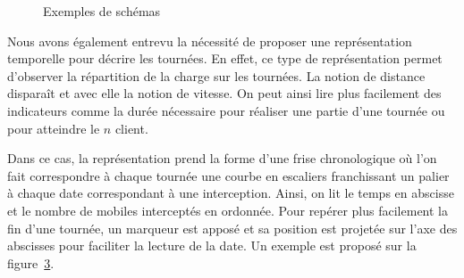 			\begin{figure}[h!]
				\begin{subfigure}[b]{.45\linewidth}
					\centering
					\begin{tikzpicture}[scale=.5]
						
					\end{tikzpicture}
					\label{subfig:spatial}
				\end{subfigure}
				\hfill
				\begin{subfigure}[b]{.45\linewidth}
					\centering
					\vfill
					\begin{tikzpicture}[schema]
						
					\end{tikzpicture}
					\vfill
					\null
					\label{subfig:schema}
				\end{subfigure}

				\begin{subfigure}{\linewidth}
					\centering
					\begin{tikzpicture}[yscale=.5]
						
					\end{tikzpicture}
					\label{subfig:example-temporal}
				\end{subfigure}
				\caption{Exemples de schémas}
				\label{fig:example}
			\end{figure}

			Nous avons également entrevu la nécessité de proposer une représentation temporelle pour décrire les tournées. En effet, ce type de représentation permet d'observer la répartition de la charge sur les tournées. La notion de distance disparaît et avec elle la notion de vitesse. On peut ainsi lire plus facilement des indicateurs comme la durée nécessaire pour réaliser une partie d'une tournée ou pour atteindre le $n$\ieme{} client.

			Dans ce cas, la représentation prend la forme d'une frise chronologique où l'on fait correspondre à chaque tournée une courbe en escaliers franchissant un palier à chaque date correspondant à une interception. Ainsi, on lit le temps en abscisse et le nombre de mobiles interceptés en ordonnée. Pour repérer plus facilement la fin d'une tournée, un marqueur est apposé et sa position est projetée sur l'axe des abscisses pour faciliter la lecture de la date. Un exemple est proposé sur la figure~\ref{subfig:example-temporal}.

		

